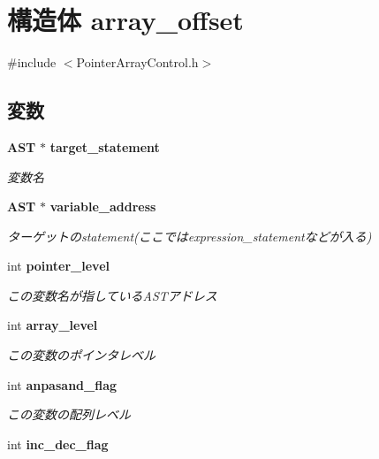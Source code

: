 \section{構造体 array\_\-offset}
\label{structarray__offset}


{\ttfamily \#include $<$PointerArrayControl.h$>$}

\subsection*{変数}
\begin{DoxyCompactItemize}
\item 
{\bf AST} $\ast$ {\bf target\_\-statement}\label{structarray__offset_afd077f3bd6710cff01a7b45ed165bde2}

\begin{DoxyCompactList}\small\item\em 変数名 \item\end{DoxyCompactList}\item 
{\bf AST} $\ast$ {\bf variable\_\-address}\label{structarray__offset_af1c0654e42cb4c87213a76c1a5ed1b49}

\begin{DoxyCompactList}\small\item\em ターゲットのstatement(ここではexpression\_\-statementなどが入る) \item\end{DoxyCompactList}\item 
int {\bf pointer\_\-level}\label{structarray__offset_acdec5a49acb00313d5f2639a8d65a19e}

\begin{DoxyCompactList}\small\item\em この変数名が指しているASTアドレス \item\end{DoxyCompactList}\item 
int {\bf array\_\-level}\label{structarray__offset_a7b52678b7dd18aee856cea8a4d33c31b}

\begin{DoxyCompactList}\small\item\em この変数のポインタレベル \item\end{DoxyCompactList}\item 
int {\bf anpasand\_\-flag}\label{structarray__offset_abb7708411833c87b184d43809fd0d0fa}

\begin{DoxyCompactList}\small\item\em この変数の配列レベル \item\end{DoxyCompactList}\item 
int {\bf inc\_\-dec\_\-flag}\label{structarray__offset_a6a247a3ddfb4d6ae418c81521b3b327e}


\end{DoxyCompactItemize}
